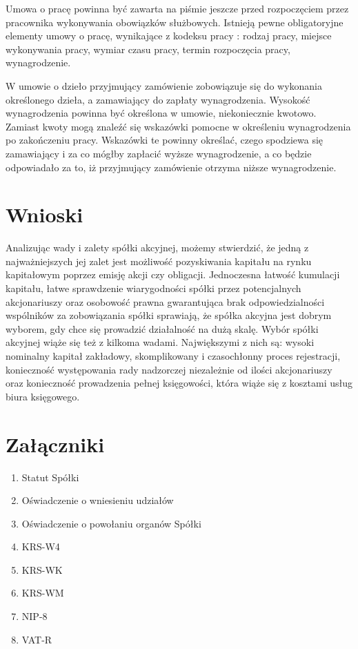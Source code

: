 \documentclass[11pt]{article}
\begin{document}
   Umowa o pracę powinna być zawarta na piśmie jeszcze przed rozpoczęciem przez pracownika wykonywania obowiązków służbowych. Istnieją pewne obligatoryjne elementy umowy o pracę, wynikające z kodeksu pracy : rodzaj pracy, miejsce wykonywania pracy, wymiar czasu pracy, termin rozpoczęcia pracy, wynagrodzenie.
    
  W umowie o dzieło przyjmujący zamówienie zobowiązuje się do wykonania określonego dzieła, a zamawiający do zapłaty wynagrodzenia. Wysokość wynagrodzenia powinna być określona w umowie, niekoniecznie kwotowo. Zamiast kwoty mogą znaleźć się wskazówki pomocne w określeniu wynagrodzenia po zakończeniu pracy. Wskazówki te powinny określać, czego spodziewa się zamawiający i za co mógłby zapłacić wyższe wynagrodzenie, a co będzie odpowiadało za to, iż przyjmujący zamówienie otrzyma niższe wynagrodzenie.
  
	\section{Wnioski}
	
	Analizując wady i zalety spółki akcyjnej, możemy stwierdzić, że jedną z najważniejszych jej zalet jest możliwość pozyskiwania kapitału na rynku kapitałowym poprzez emisję akcji czy obligacji.
Jednoczesna łatwość kumulacji kapitału, łatwe sprawdzenie wiarygodności spółki przez potencjalnych akcjonariuszy oraz osobowość prawna gwarantująca brak odpowiedzialności wspólników za zobowiązania spółki sprawiają, że spółka akcyjna jest dobrym wyborem, gdy chce się prowadzić działalność na dużą skalę.
Wybór spółki akcyjnej wiąże się też z kilkoma wadami. Największymi z nich są: wysoki nominalny kapitał zakładowy, skomplikowany i czasochłonny proces rejestracji, konieczność występowania rady nadzorczej niezależnie od ilości akcjonariuszy oraz konieczność prowadzenia pełnej księgowości, która wiąże się z kosztami usług biura księgowego.
    
    \section{Załączniki}
    \begin{enumerate}
    	\item Statut Spółki
    	\item Oświadczenie o wniesieniu udziałów
    	\item Oświadczenie o powołaniu organów Spółki
    	\item KRS-W4
    	\item KRS-WK
    	\item KRS-WM
    	\item NIP-8
    	\item VAT-R
    \end{enumerate}
\end{document}
